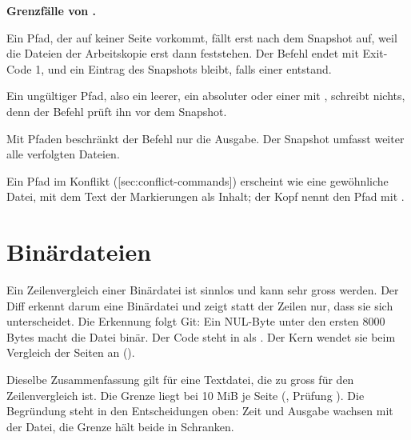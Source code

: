 \startplacefigure[title={Änderungen ansehen als Zeitachse},
    reference=fig:diff-timeline,location=here]
\stopplacefigure

\startinfobox
{\bf Grenzfälle von .}
\startitemize
\item Ein Pfad, der auf keiner Seite vorkommt, fällt erst nach dem Snapshot auf, weil die Dateien
der Arbeitskopie erst dann feststehen. Der Befehl endet mit Exit-Code 1, und ein Eintrag des
Snapshots bleibt, falls einer entstand.
\item Ein ungültiger Pfad, also ein leerer, ein absoluter oder einer mit ,
schreibt nichts, denn der Befehl prüft ihn vor dem Snapshot.
\item Mit Pfaden beschränkt der Befehl nur die Ausgabe. Der Snapshot umfasst weiter alle
verfolgten Dateien.
\item Ein Pfad im Konflikt ([sec:conflict-commands]) erscheint wie eine gewöhnliche
Datei, mit dem Text der Markierungen als Inhalt; der Kopf nennt den Pfad mit
.
\stopitemize
\stopinfobox

\section[sec:binary]{Binärdateien}

Ein Zeilenvergleich einer Binärdatei ist sinnlos und kann sehr gross werden. Der Diff erkennt
darum eine Binärdatei und zeigt statt der Zeilen nur, dass sie sich unterscheidet. Die Erkennung
folgt Git: Ein NUL-Byte unter den ersten 8000 Bytes macht die Datei binär. Der Code steht in
 als . Der Kern wendet sie beim Vergleich der Seiten an
().

Dieselbe Zusammenfassung gilt für eine Textdatei, die zu gross für den Zeilenvergleich ist.
Die Grenze liegt bei 10 MiB je Seite (, Prüfung ).
Die Begründung steht in den Entscheidungen oben: Zeit und Ausgabe wachsen mit der Datei,
die Grenze hält beide in Schranken.

